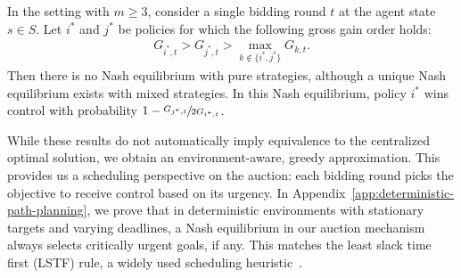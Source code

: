 \begin{theorem}\label{thm:allpay-favors-high-control-gain}
	In the \allpay setting with $m\geq 3$, consider a single bidding round $t$ at the agent state $s\in S$.
	Let $i^*$ and $j^*$ be policies for which the following gross gain order holds:
	\begin{align}\label{eqn:allpay urgency gap}
		G_{i^*,t} > G_{j^*,t} > \max_{k\notin \{i^*,j^*\}}G_{k,t}.
	\end{align}
	Then there is no Nash equilibrium with pure strategies, although a unique Nash equilibrium exists with mixed strategies.
	In this Nash equilibrium, policy $i^*$ wins control with probability $1-\sfrac{G_{j^*,t}}{2G_{i^*,t}}$.	
\end{theorem}

While these results do not automatically imply equivalence to the centralized optimal solution, we obtain an environment-aware, greedy approximation.
This provides us a scheduling perspective on the auction: each bidding round picks the objective to receive control based on its urgency.
In Appendix~\ref{app:deterministic-path-planning}, we prove that in deterministic environments with stationary targets and varying deadlines, a Nash equilibrium in our auction mechanism always selects critically urgent goals, if any.
This matches the least slack time first (LSTF) rule, a widely used scheduling heuristic~\citep{brown2020optimal}.


